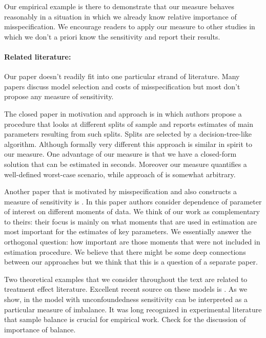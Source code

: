 \documentclass[12pt]{article}
\theoremstyle{plain}
\begin{document}
Our empirical example is there to demonstrate that our measure behaves reasonably in a situation in which we already know relative importance of misspecification. We encourage readers to apply our measure to other studies in which we don't a priori know the sensitivity and report their results. 


\paragraph{Related literature:} Our paper doesn't readily fit into one particular strand of literature. Many papers discuss model selection and costs of misspecification but most don't propose any measure of sensitivity. 

The closed paper in motivation and approach is \parencite{athey2015measure} in which authors propose a procedure that looks at different splits of sample and reports estimates  of main parameters resulting from such splits. Splits are selected by a decision-tree-like algorithm. Although formally very different this approach is similar in spirit to our measure. One advantage of our measure is that we have a closed-form solution that can be estimated in seconds. Moreover our measure quantifies a well-defined worst-case scenario, while approach of  \parencite{athey2015measure} is somewhat arbitrary. 

Another paper that is motivated by misspecification and also constructs a measure of sensitivity is \parencite{gentzkow2014measuring}. In this paper authors consider dependence of parameter of interest on different moments of data. We think of  our work as complementary to theirs: their focus is mainly on what moments that are used in estimation are most important for the estimates of  key parameters. We essentially answer the orthogonal question: how important are those moments that were not included in estimation procedure. We believe that there might be some deep connections between our approaches but we think that this is a question of a separate paper. 

Two theoretical examples that we consider throughout the text are related to treatment effect literature. Excellent recent source on these models is \parencite{imbens2015causal}. As we show, in the model with unconfoundedness sensitivity can be interpreted as a particular measure of imbalance. It was long recognized in experimental literature that sample balance is crucial for empirical work. Check  \parencite{imbens2015causal} for the discussion of importance of balance. 
\end{document}
